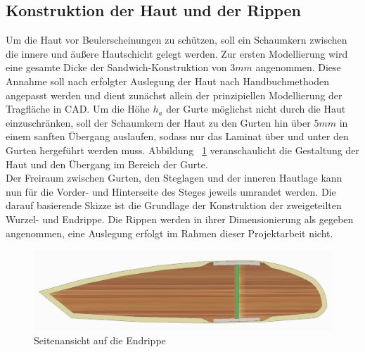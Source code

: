 \subsection{Konstruktion der Haut und der Rippen}
Um die Haut vor Beulerscheinungen zu schützen, soll ein Schaumkern zwischen die innere und äußere Hautschicht gelegt werden. Zur ersten Modellierung wird eine gesamte Dicke der Sandwich-Konstruktion von $ 3mm $ angenommen. Diese Annahme soll nach erfolgter Auslegung der Haut nach Handbuchmethoden angepasst werden und dient zunächst allein der prinzipiellen Modellierung der Tragfläche in CAD. Um die Höhe $ h_{a} $ der Gurte möglichst nicht durch die Haut einzuschränken, soll der Schaumkern der Haut zu den Gurten hin über $ 5mm $ in einem sanften Übergang auslaufen, sodass nur das Laminat über und unter den Gurten hergeführt werden muss. Abbildung ~\ref{fig: Seite} veranschaulicht die Gestaltung der Haut und den Übergang im Bereich der Gurte.\\

\noindent Der Freiraum zwischen Gurten, den Steglagen und der inneren Hautlage kann nun für die Vorder- und Hinterseite des Steges jeweils umrandet werden. Die darauf basierende Skizze ist die Grundlage der Konstruktion der zweigeteilten Wurzel- und Endrippe. Die Rippen werden in ihrer Dimensionierung als gegeben angenommen, eine Auslegung erfolgt im Rahmen dieser Projektarbeit nicht.\\

\begin{figure}[h]
	\includegraphics[width=1.0\textwidth]{Bilder/Seite.jpg}
	\caption{Seitenansicht auf die Endrippe}
	\label{fig: Seite}
\end{figure}

